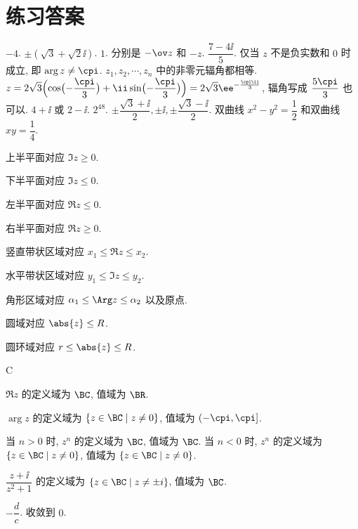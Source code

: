 \chapter{练习答案}


\begin{multicols}{2}

\setcounter{chapter}{0}

\begin{exerciseanswer}
  \exans $-4$.
  \exans $\pm(\sqrt3+\sqrt2\ii)$.
  \exans $1$.
  \exans 分别是 $-\ov z$ 和 $-z$.
  \exans $\dfrac{7-4\ii}5$.
  \exans 仅当 $z$ 不是负实数和 $0$ 时成立, 即 $\arg z\neq\cpi$.
  \exans $z_1,z_2,\cdots,z_n$ 中的非零元辐角都相等.
  \exans $\displaystyle z=2\sqrt3\Bigl(\cos\bigl(-\frac\cpi3\bigr)+\ii\sin\bigl(-\frac\cpi3\bigr)\Bigr)=2\sqrt3\ee^{-\frac{\cpi\ii}3}$, 辐角写成 $\dfrac{5\cpi}3$ 也可以.
  \exans $4+\ii$ 或 $2-\ii$.
  \exans $2^{48}$.
  \exans $\pm\dfrac{\sqrt3+\ii}2,\pm \ii,\pm\dfrac{\sqrt3-\ii}2$.
  \exans 双曲线 $x^2-y^2=\dfrac12$ 和双曲线 $xy=\dfrac14$.
  \begin{exansenum}
    \item 上半平面对应 $\Im z\ge0$.
    \item 下半平面对应 $\Im z\le0$.
    \item 左半平面对应 $\Re z\le0$.
    \item 右半平面对应 $\Re z\ge0$.
    \item 竖直带状区域对应 $x_1\le\Re z\le x_2$.
    \item 水平带状区域对应 $y_1\le\Im z\le y_2$.
    \item 角形区域对应 $\alpha_1\le \Arg z\le \alpha_2$ 以及原点.
    \item 圆域对应 $\abs{z}\le R$.
    \item 圆环域对应 $r\le\abs{z}\le R$.
  \end{exansenum}
  \exans C
  \begin{exansenum}
    \item $\Re z$ 的定义域为 $\BC$, 值域为 $\BR$.
    \item $\arg z$ 的定义域为 $\{z\in\BC\mid z\neq 0\}$, 值域为 $(-\cpi,\cpi]$.
    \item 当 $n>0$ 时, $z^n$ 的定义域为 $\BC$, 值域为 $\BC$.
    当 $n<0$ 时, $z^n$ 的定义域为 $\{z\in\BC\mid z\neq 0\}$, 值域为 $\{z\in\BC\mid z\neq 0\}$.
    \item $\dfrac{z+\ii}{z^2+1}$ 的定义域为 $\{z\in\BC\mid z\neq \pm i\}$, 值域为 $\BC$.
  \end{exansenum}
  \exans $-\dfrac dc$.
  \exans 收敛到 $0$.
\end{exerciseanswer}


\end{multicols}

